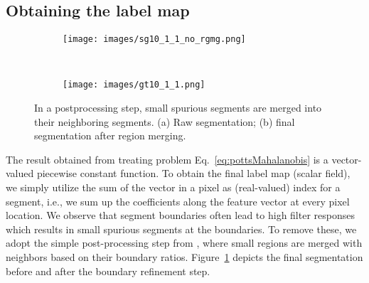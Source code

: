 \documentclass[journal]{IEEEtran}
\begin{document}
\subsection{Obtaining the label map}
\begin{figure}[t]
    \centering
    \begin{subfigure}[b]{0.48\linewidth}
        \texttt{[image: images/sg10\_1\_1\_no\_rgmg.png]}
        \caption{}
    \end{subfigure}
    ~
    \begin{subfigure}[b]{0.48\linewidth}
        \texttt{[image: images/gt10\_1\_1.png]}
        \caption{}
    \end{subfigure}
    \caption{In a postprocessing step, small spurious segments are merged into their neighboring segments. (a) Raw segmentation; (b) final segmentation after region merging.}
    \label{fig:region_merging}
\end{figure}
The result obtained from treating problem  Eq.~\eqref{eq:pottsMahalanobis} is a vector-valued piecewise constant function.
To obtain the final label map (scalar field), 
we simply utilize the sum of the vector in a pixel as (real-valued) index for a segment,
i.e., we sum up the coefficients along the feature vector at every pixel location.
We observe that segment boundaries often lead to high filter responses
which results in small spurious segments at the boundaries.
To remove these, 
we adopt the simple post-processing step from \cite{yuan2015factorization}, where small regions are merged with neighbors based on their boundary ratios.
Figure~\ref{fig:region_merging} depicts the final segmentation before and after the boundary refinement step.







 
\end{document}
